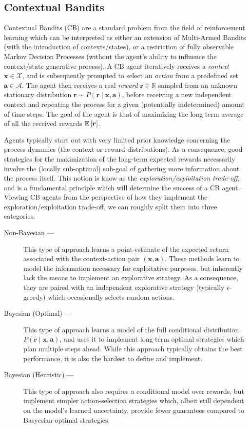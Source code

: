 \documentclass[11pt]{article}
\begin{document}
\subsection{Contextual Bandits}

Contextual Bandits (CB) are a standard problem from the field of reinforcement
learning which can be interpreted as either an extension of Multi-Armed Bandits
(with the introduction of contexts/states), or a restriction of fully
observable Markov Decision Processes (without the agent's ability to influence
the context/state generative process).  A CB agent iteratively receives
a \emph{context} $\bm x\in\mathcal{X}$, and is subsequently prompted to select an
\emph{action} from a predefined set $\bm a\in\mathcal{A}$.  The agent then receives
a real \emph{reward} $\bm r\in\mathbb{R}$ sampled from an unknown stationary
distribution $\bm r\sim P(\bm r\mid \bm x, \bm a)$, before receiving a new
independent context and repeating the process for a given (potentially
indetermined) amount of time steps.  The goal of the agent is that of
maximizing the long term average of all the received rewards ${\mathbb{E}}\left[\bm
r\right]$.  

Agents typically start out with very limited prior knowledge concerning the
process dynamics (the context or reward distributions).  As a consequence, good
strategies for the maximization of the long-term expected rewards necessarily
involve the (locally sub-optimal) sub-goal of gathering more information about
the process itself.  This notion is know as the \emph{exploration/exploitation
trade-off}, and is a fundamental principle which will determine the success of
a CB agent.  Viewing CB agents from the perspective of how they implement the
exploration/exploitation trade-off, we can roughly split them into three
categories:
%
\begin{description}
  \item[Non-Bayesian ---]  This type of approach learns a point-estimate of the
    expected return associated with the context-action pair $(\bm x, \bm a)$.
    These methods learn to model the information necessary for exploitative
    purposes, but inherently lack the means to implement an explorative
    strategy.  As a consequence, they are paired with an independent
    explorative strategy (typically $\epsilon$-greedy) which occasionally
    selects random actions.
  \item[Bayesian (Optimal) ---]  This type of approach learns a model of the
    full conditional distribution $P(\bm r\mid \bm x, \bm a)$, and uses it to
    implement long-term optimal strategies which plan multiple steps ahead.
    While this approach typically obtains the best performance, it is also the
    hardest to define and implement.
  \item[Bayesian (Heuristic) ---]  This type of approach also requires
    a conditional model over rewards, but implement simpler action-selection
    strategies which, albeit still dependent on the model's learned uncertainty,
    provide fewer guarantees compared to Basyesian-optimal strategies.  
\end{description}
\end{document}
